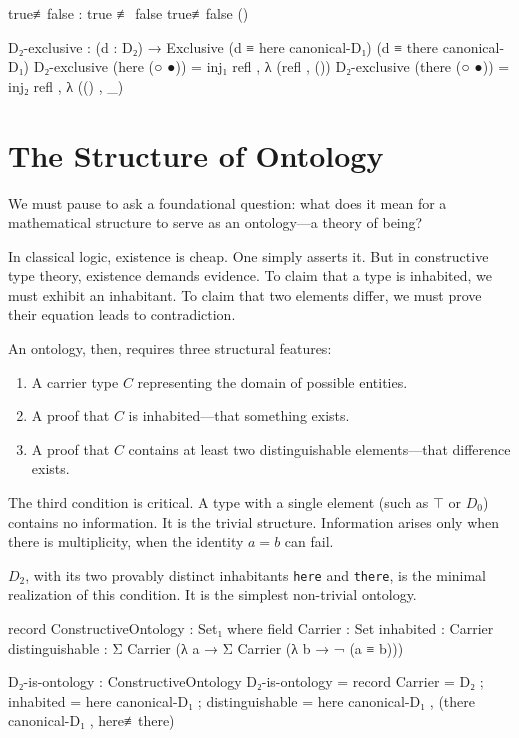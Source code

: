 \documentclass[11pt,a4paper]{book}
\begin{document}
\begin{code}
true≢false : true ≢ false
true≢false ()
\end{code}

\begin{code}
D₂-exclusive : (d : D₂) → Exclusive (d ≡ here canonical-D₁) (d ≡ there canonical-D₁)
D₂-exclusive (here (○ ●)) = inj₁ refl , λ { (refl , ()) }
D₂-exclusive (there (○ ●)) = inj₂ refl , λ { (() , _) }

\end{code}

\section{The Structure of Ontology}

We must pause to ask a foundational question: what does it mean for a mathematical 
structure to serve as an ontology—a theory of being?

In classical logic, existence is cheap. One simply asserts it. But in constructive 
type theory, existence demands evidence. To claim that a type is inhabited, we must 
exhibit an inhabitant. To claim that two elements differ, we must prove their 
equation leads to contradiction.

An ontology, then, requires three structural features:
\begin{enumerate}
\item A carrier type $C$ representing the domain of possible entities.
\item A proof that $C$ is inhabited—that something exists.
\item A proof that $C$ contains at least two distinguishable elements—that difference exists.
\end{enumerate}

The third condition is critical. A type with a single element (such as $\top$ or $D_0$) 
contains no information. It is the trivial structure. Information arises only when 
there is multiplicity, when the identity $a = b$ can fail.

$D_2$, with its two provably distinct inhabitants \texttt{here} and \texttt{there}, 
is the minimal realization of this condition. It is the simplest non-trivial ontology.

\begin{code}
record ConstructiveOntology : Set₁ where
  field
    Carrier : Set
    inhabited : Carrier
    distinguishable : Σ Carrier (λ a → Σ Carrier (λ b → ¬ (a ≡ b)))

D₂-is-ontology : ConstructiveOntology
D₂-is-ontology = record
  { Carrier = D₂
  ; inhabited = here canonical-D₁
  ; distinguishable = here canonical-D₁ , (there canonical-D₁ , here≢there)
  }
\end{code}
\end{document}

